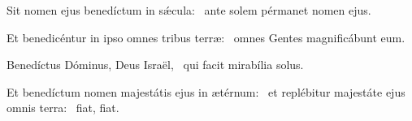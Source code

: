 \item Sit nomen ejus benedíctum in sǽcula:~\psstar{} ante solem pérmanet nomen ejus.

\item Et benedicéntur in ipso omnes tribus terræ:~\psstar{} omnes Gentes magnificábunt eum.

\item Benedíctus Dóminus, Deus Israël,~\psstar{} qui facit mirabília solus.

\item Et benedíctum nomen majestátis ejus in ætérnum:~\pscross{} et replébitur majestáte ejus omnis terra:~\psstar{} fiat, fiat.

